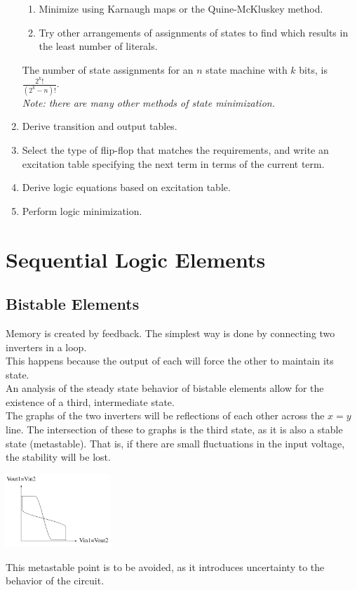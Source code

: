 \documentclass[nobib]{tufte-handout}
\begin{document}
\begin{enumerate}
\begin{enumerate}
                  \item Minimize using Karnaugh maps or the Quine-McKluskey method.
                  \item Try other arrangements of assignments of states to find which results in the
                        least number of literals.
              \end{enumerate}
              The number of state assignments for an $n$ state machine with $k$ bits, is $\frac{2^k!}{(2^k-n)!}$.\\
              \textit{Note: there are many other methods of state minimization.}
        \item Derive transition and output tables.
        \item Select the type of flip-flop that matches the requirements, and write an
              excitation table specifying the next term in terms of the current term.\\
        \item Derive logic equations based on excitation table.
        \item Perform logic minimization.
    \end{enumerate}
    \section{Sequential Logic Elements}
    \subsection{Bistable Elements}
    Memory is created by feedback. The simplest way is done by connecting two
    inverters in a loop.\\ This happens because the output of each will force the
    other to maintain its state.\\ An analysis of the steady state behavior of
    bistable elements allow for the existence of a third, intermediate state.\\ The
    graphs of the two inverters will be reflections of each other across the $x=y$
    line. The intersection of these to graphs is the third state, as it is also a
    stable state (metastable). That is, if there are small fluctuations in the
    input voltage, the stability will be lost.\\
    \begin{center}
        \includegraphics[width = 150px]{images/bistable.png}
    \end{center}
    This metastable point is to be avoided, as it introduces uncertainty to the behavior of the circuit.
\end{document}
